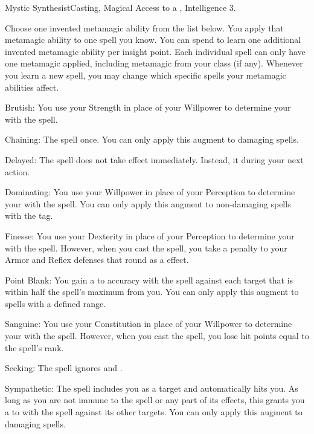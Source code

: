   \begin{magicalfeat}{Mystic Synthesist}{Casting, Magical}
    \featpre Access to a , Intelligence 3.

     Choose one invented metamagic ability from the list below.
    You apply that metamagic ability to one spell you know.
    You can spend  to learn one additional invented metamagic ability per insight point.
    Each individual spell can only have one metamagic applied, including metamagic from your class (if any).
    Whenever you learn a new spell, you may change which specific spells your metamagic abilities affect.
    \begin{raggeditemize}
      \item Brutish: You use your Strength in place of your Willpower to determine your  with the spell.
      \item Chaining: The spell  once.
        You can only apply this augment to  damaging spells.
      \item Delayed: The spell does not take effect immediately.
        Instead, it  during your next action.
      \item Dominating: You use your Willpower in place of your Perception to determine your  with the spell.
        You can only apply this augment to non-damaging spells with the \atCompulsion tag.
      \item Finesse: You use your Dexterity in place of your Perception to determine your  with the spell.
        However, when you cast the spell, you take a  penalty to your Armor and Reflex defenses that round as a \atSwift effect.
      \item Point Blank: You gain a   to accuracy with the spell against each target that is within half the spell's maximum  from you.
        You can only apply this augment to  spells with a defined range.
      \item Sanguine: You use your Constitution in place of your Willpower to determine your  with the spell.
        However, when you cast the spell, you lose hit points equal to the spell's rank.
      \item Seeking: The spell ignores  and .
      \item Sympathetic: The spell includes you as a target and automatically hits you.
        As long as you are not immune to the spell or any part of its effects, this grants you a   to  with the spell against its other targets.
        You can only apply this augment to  damaging spells.
    \end{raggeditemize}


\end{magicalfeat}
